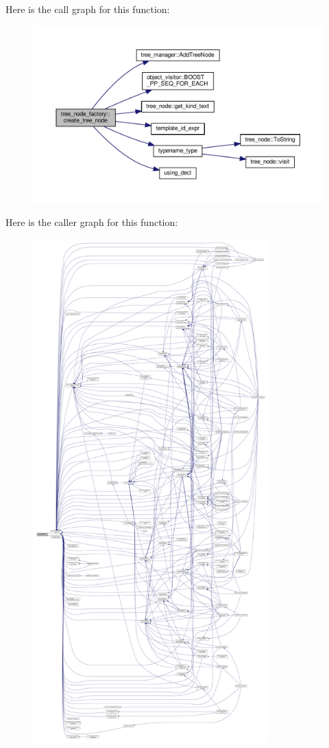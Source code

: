 Here is the call graph for this function\+:
\nopagebreak
\begin{figure}[H]
\begin{center}
\leavevmode
\includegraphics[width=350pt]{d8/da3/structtree__node__factory_a54487c2d0dfeeab04df6242dc59dd78f_cgraph}
\end{center}
\end{figure}
Here is the caller graph for this function\+:
\nopagebreak
\begin{figure}[H]
\begin{center}
\leavevmode
\includegraphics[height=550pt]{d8/da3/structtree__node__factory_a54487c2d0dfeeab04df6242dc59dd78f_icgraph}
\end{center}
\end{figure}



